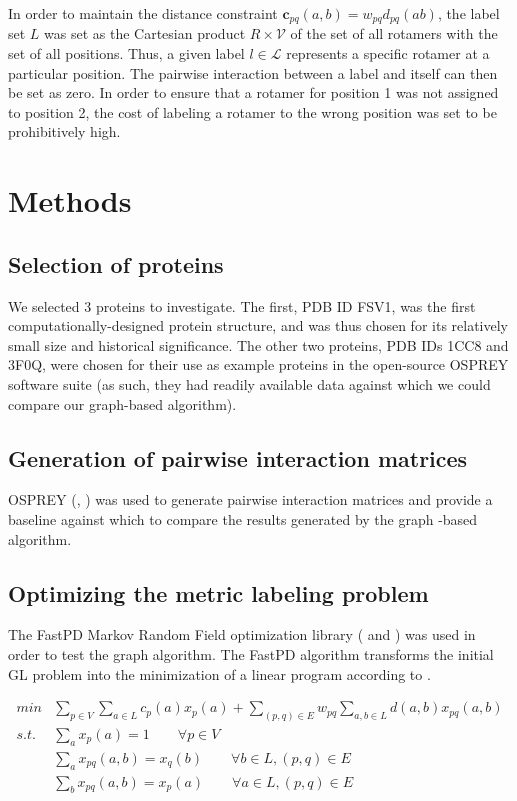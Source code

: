 \documentclass[11pt]{article}
\begin{document}
	In order to maintain the distance constraint 
	$\textbf{c}_{pq}(a,b) =  w_{pq}d_{pq}(ab)$, the label set $L$ was set as the
	Cartesian product $R \times \mathcal{V}$ of the set of all rotamers with the set
	of all positions. Thus, a given label $l \in \mathcal{L}$ represents a specific
	rotamer at a particular position. The pairwise interaction between a label and
	itself can then be set as zero. In order to ensure that a rotamer for position 1
	was not assigned to position 2, the cost of labeling a rotamer to the wrong
	position was set to be prohibitively high. 
	
	\section{Methods}
	
	\subsection{Selection of proteins}
	We selected 3 proteins to investigate. The first, PDB ID FSV1, was the first
	computationally-designed protein structure, and was thus chosen for its relatively
	small size and historical significance. The other two proteins, PDB IDs 1CC8 and
	3F0Q, were chosen for their use as example proteins in the open-source OSPREY
	software suite (as such, they had readily available data against which we could
	compare our graph-based algorithm). 
	
	\subsection{Generation of pairwise interaction matrices}
	OSPREY (\cite{OS1}, \cite{OS2}) was used to generate pairwise interaction matrices
	and provide a baseline against which to compare the results generated by the graph
	-based algorithm.
	
	\subsection{Optimizing the metric labeling problem}
	The FastPD Markov Random Field optimization library 
	(\cite{Karmarkar} and \cite{Komodakis}) was used in order to test the graph
	algorithm. The FastPD algorithm transforms the initial GL problem into the
	minimization of a linear program according to \cite{CKNZ}. 
	
	\begin{equation}
		\begin{split}
		min & \sum_{p \in V} \sum_{a\in L} c_p(a)x_p(a)+ \sum_{(p,q) \in E} w_{pq}
		 \sum_{a,b \in L}d(a,b) x_{pq}(a,b)\\
		s.t. & \sum_a x_p(a) =1 \qquad \forall p \in V\\
		& \sum_a x_{pq}(a,b)=x_q(b) \qquad \forall b \in L, (p,q) \in E\\
		& \sum_b x_{pq}(a,b)=x_p(a) \qquad \forall a \in L, (p,q) \in E
		\end{split}
	\label{linear}
	\end{equation}
	
\end{document}
